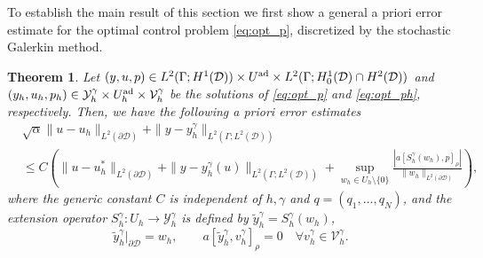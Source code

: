 \documentclass[a4paper,10pt]{article}
\newcommand{\cD}{{\mathcal{D}}}
\newcommand{\uL}{{L^2(\Gamma;L^2(\partial \cD))}}
\newcommand{\uH}{{L^2(\Gamma;H^{1/2}(\partial \cD))}}
\newcommand{\yL}{{L^2(\Gamma;L^2(\cD))}}
\newtheorem{theorem}{Theorem}[section]
\numberwithin{theorem}{section}
\begin{document}
To establish the main result of this section we first show a general a priori error estimate for the optimal control problem \eqref{eq:opt_p}, discretized by the stochastic Galerkin method.
\begin{theorem}
\label{thm:general_estimate}
 Let $(y,u,p) \in L^2(\Gamma;H^1(\cD)) \times U^{\textup{ad}} \times L^2(\Gamma;H^1_0(\cD) \cap H^2(\cD))$  and $(y_h,u_h,p_h) \in \mathcal{Y}_h^{\gamma} \times U_h^{\textup{ad}} \times  \mathcal{V}_h^{\gamma}$ be the solutions of \eqref{eq:opt_p} and \eqref{eq:opt_ph}, respectively. Then, we have the following a priori error estimates 
 \begin{align}\label{eq:basic_error_estimate}
  & \sqrt\alpha\|u-u_h\|_{L^2(\partial \cD)} + \|y - y_h^\gamma \|_{\yL} \nonumber \\
  & \le C\left( \|u - u_h^*\|_{L^2(\partial \cD)}
  + \|y-y_h^\gamma(u)\|_{L^2(\Gamma;L^2(\cD))}
  +\sup_{w_h\in U_h \setminus\{0\}} \frac{|a[S_h^\gamma (w_h), p]_{\rho}|}{\|w_h\|_{L^2(\partial \cD)}} \right),
 \end{align}
 where the generic constant $C$ is independent of $h, \gamma$ and $q = (q_1,\ldots,q_N)$, and the extension operator $S_h^\gamma\colon U_h \to \mathcal Y_h^\gamma$ is defined by $\widetilde y_h^\gamma = S_h^\gamma(w_h)$,
\begin{equation*}
	\widetilde y_h^\gamma|_{\partial\cD} = w_h,\qquad a[\widetilde y_h^\gamma, v_h^\gamma]_\rho = 0 \quad \forall  v_h^\gamma \in \mathcal V_h^\gamma.
\end{equation*}
\end{theorem}
\end{document}
